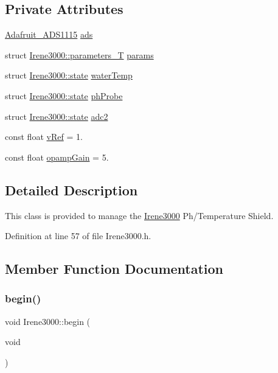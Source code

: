 \subsection*{Private Attributes}
\begin{DoxyCompactItemize}
\item 
\hyperlink{class_adafruit___a_d_s1115}{Adafruit\+\_\+\+A\+D\+S1115} \hyperlink{class_irene3000_a1215e77ba761c9908d80d691f149e135}{ads}
\item 
struct \hyperlink{struct_irene3000_1_1parameters___t}{Irene3000\+::parameters\+\_\+T} \hyperlink{class_irene3000_a136585a5ee7f9ac6ab52175fa153f8e3}{params}
\item 
struct \hyperlink{struct_irene3000_1_1state}{Irene3000\+::state} \hyperlink{class_irene3000_af05612c78c758ce9db316c75ad937130}{water\+Temp}
\item 
struct \hyperlink{struct_irene3000_1_1state}{Irene3000\+::state} \hyperlink{class_irene3000_a997a4ee466fa1d5416e07e444965dc9e}{ph\+Probe}
\item 
struct \hyperlink{struct_irene3000_1_1state}{Irene3000\+::state} \hyperlink{class_irene3000_aae3a95a1c83c766cd2f299ce471c337e}{adc2}
\item 
const float \hyperlink{class_irene3000_a018e7ff9bee57e6d2b298667a668ba7e}{v\+Ref} = 1.
\item 
const float \hyperlink{class_irene3000_a4e588985ca74e5076029d5dee81034f2}{opamp\+Gain} = 5.
\end{DoxyCompactItemize}


\subsection{Detailed Description}
This class is provided to manage the \hyperlink{class_irene3000}{Irene3000} Ph/\+Temperature Shield. 

Definition at line 57 of file Irene3000.\+h.



\subsection{Member Function Documentation}
\mbox{\label{class_irene3000_ad5891806c500ae1007afe52b9e304c2b}} 
\subsubsection{\texorpdfstring{begin()}{begin()}}
{\footnotesize\ttfamily void Irene3000\+::begin (\begin{DoxyParamCaption}\item[{void}]{ }\end{DoxyParamCaption})}

